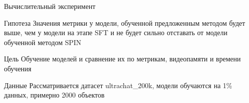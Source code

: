 \documentclass{beamer}
\begin{document}
\begin{frame}{Вычислительный эксперимент}
\begin{block}{Гипотеза}
Значения метрики у модели, обученной предложенным методом будет выше, чем у модели на этапе SFT и не будет сильно отставать от модели обученной методом SPIN
\end{block}

\begin{block}{Цель}
Обучение моделей и сравнение их по метрикам, видеопамяти и времени обучения
\end{block}

\begin{block}{Данные}
Рассматривается датасет ultrachat\_200k, модели обучаются на 1\% данных, примерно 2000 объектов
\end{block}

\end{frame}

\end{document}
